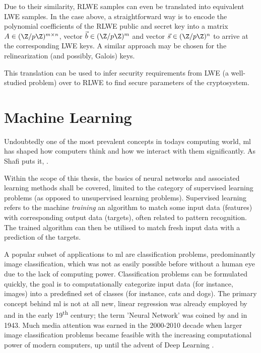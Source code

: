 Due to their similarity, RLWE samples can even be translated into equivalent LWE samples.
In the case above, a straightforward way is to encode the polynomial coefficients of the RLWE public and secret key into a matrix $A \in (\Z/p\Z)^{m \times n}$, vector $\vec{b} \in (\Z/p\Z)^m$ and vector $\vec{s} \in (\Z/p\Z)^n$ to arrive at the corresponding LWE keys.
A similar approach may be chosen for the relinearization (and possibly, Galois) keys.

This translation can be used to infer security requirements from LWE (a well-studied problem) over to RLWE to find secure parameters of the cryptosystem.

\pagebreak
\section{Machine Learning}
\label{sec:machine-learning}
Undoubtedly one of the most prevalent concepts in todays computing world, \gls{ml} has shaped how computers think and how we interact with them significantly.
As Shafi  puts it, .

Within the scope of this thesis, the basics of neural networks and associated learning methods shall be covered, limited to the category of supervised learning problems (as opposed to unsupervised learning problems).
Supervised learning refers to the machine \textit{training} an algorithm to match some input data (features) with corresponding output data (targets), often related to pattern recognition.
The trained algorithm can then be utilised to match fresh input data with a prediction of the targets.

A popular subset of applications to \gls{ml} are classification problems, predominantly image classification, which was not as easily possible before without a human eye due to the lack of computing power.
Classification problems can be formulated quickly, the goal is to computationally categorize input data (for instance, images) into a predefined set of classes (for instance, cats and dogs).
The primary concept behind \acrlong{ml} is not at all new, linear regression was already employed by  and  in the early 19\textsuperscript{th} century; the term 'Neural Network' was coined by  and  in 1943.
Much media attention was earned in the 2000-2010 decade when larger image classification problems became feasible with the increasing computational power of modern computers, up until the advent of Deep Learning \parencite{bishop-pattern-recognition-and-ml}.

